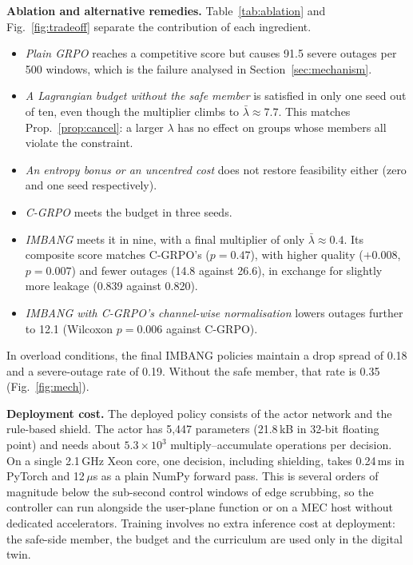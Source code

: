 \documentclass[conference]{IEEEtran}
\begin{document}
\textbf{Ablation and alternative remedies.} Table~\ref{tab:ablation} and Fig.~\ref{fig:tradeoff} separate the contribution of each ingredient.
\begin{itemize}
\item \emph{Plain GRPO} reaches a competitive score but causes 91.5 severe outages per 500 windows, which is the failure analysed in Section~\ref{sec:mechanism}.
\item \emph{A Lagrangian budget without the safe member} is satisfied in only one seed out of ten, even though the multiplier climbs to $\bar\lambda\approx7.7$. This matches Prop.~\ref{prop:cancel}: a larger $\lambda$ has no effect on groups whose members all violate the constraint.
\item \emph{An entropy bonus or an uncentred cost} does not restore feasibility either (zero and one seed respectively).
\item \emph{C-GRPO} meets the budget in three seeds.
\item \emph{IMBANG} meets it in nine, with a final multiplier of only $\bar\lambda\approx0.4$. Its composite score matches C-GRPO's ($p=0.47$), with higher quality ($+0.008$, $p=0.007$) and fewer outages (14.8 against 26.6), in exchange for slightly more leakage (0.839 against 0.820).
\item \emph{IMBANG with C-GRPO's channel-wise normalisation} lowers outages further to 12.1 (Wilcoxon $p=0.006$ against C-GRPO).
\end{itemize}
In overload conditions, the final IMBANG policies maintain a drop spread of 0.18 and a severe-outage rate of 0.19. Without the safe member, that rate is 0.35 (Fig.~\ref{fig:mech}).

\textbf{Deployment cost.} The deployed policy consists of the actor network and the rule-based shield. The actor has 5{,}447 parameters (21.8\,kB in 32-bit floating point) and needs about $5.3\times10^{3}$ multiply--accumulate operations per decision. On a single 2.1\,GHz Xeon core, one decision, including shielding, takes 0.24\,ms in PyTorch and 12\,$\mu$s as a plain NumPy forward pass. This is several orders of magnitude below the sub-second control windows of edge scrubbing, so the controller can run alongside the user-plane function or on a MEC host without dedicated accelerators. Training involves no extra inference cost at deployment: the safe-side member, the budget and the curriculum are used only in the digital twin.
\end{document}
